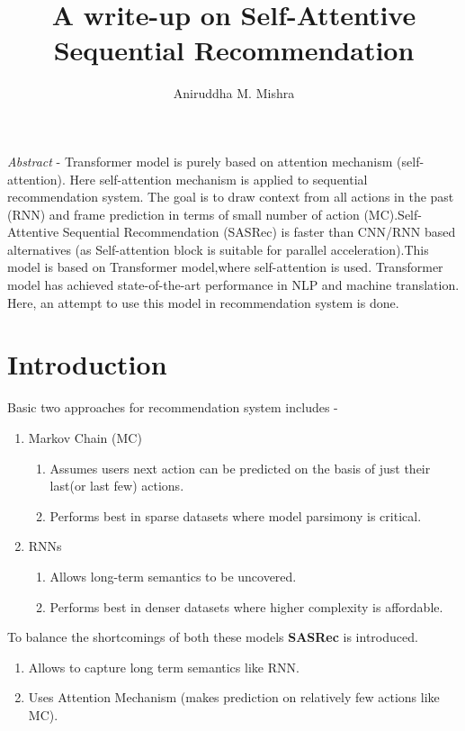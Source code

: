 \documentclass[11pt]{article}
\begin{document}
\title{A write-up on Self-Attentive Sequential Recommendation}
\author{Aniruddha M. Mishra} 
\maketitle

\emph{Abstract} - 
	Transformer model is purely based on attention mechanism (self-attention). Here self-attention mechanism is applied  to sequential recommendation system. The goal is to draw context from all actions in the past (RNN) and frame prediction in terms of small number of action (MC).Self-Attentive Sequential Recommendation (SASRec) is faster than CNN/RNN based alternatives (as Self-attention block is suitable for parallel acceleration).This model is based on Transformer model,where self-attention is used. Transformer model has achieved state-of-the-art performance in NLP and machine translation. Here, an attempt to use this model in recommendation system is done.

\section{Introduction}
Basic two approaches for recommendation system includes -
\begin{enumerate}
			\item Markov Chain (MC)
				\begin{enumerate}
					\item Assumes users next action can be predicted on the basis of just their last(or last few) actions.
					\item Performs best in sparse datasets where model parsimony is critical.
				\end{enumerate}
			\item RNNs
				\begin{enumerate}
					\item Allows long-term semantics to be uncovered.
					\item Performs best in denser datasets where higher complexity is affordable.
				\end{enumerate}
\end{enumerate}
To balance the shortcomings of both these models \textbf{SASRec} is introduced.
\begin{enumerate}
	\item Allows to capture long term semantics like RNN.
	\item Uses Attention Mechanism (makes prediction on relatively few actions like MC).
\end{enumerate}
\end{document}
